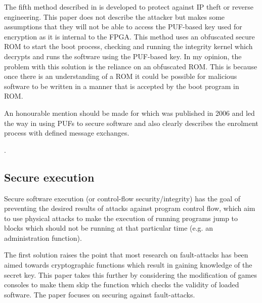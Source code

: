 The fifth method described in \cite{Gora2010} is developed to protect against IP theft or reverse engineering. This paper does not describe the attacker but makes some assumptions that they will not be able to access the PUF-based key used for encryption as it is internal to the FPGA. This method uses an obfuscated secure ROM to start the boot process, checking and running the integrity kernel which decrypts and runs the software using the PUF-based key. In my opinion, the problem with this solution is the reliance on an obfuscated ROM. This is because once there is an understanding of a ROM it could be possible for malicious software to be written in a manner that is accepted by the boot program in ROM.

\ifnotesincluded
{}
\fi

An honourable mention should be made for \cite{Simpson2006} which was published in 2006 and led the way in using PUFs to secure software and also clearly describes the enrolment process with defined message exchanges.

\ifnotesincluded
{}.
\fi


\subsection{Secure execution}\label{secureExecutionSolutions}

Secure software execution (or control-flow security/integrity) has the goal of preventing the desired results of attacks against program control flow, which aim to use physical attacks to make the execution of running programs jump to blocks which should not be running at that particular time (e.g. an administration function).

The first solution \cite{Werner2016} raises the point that most research on fault-attacks has been aimed towards cryptographic functions which result in gaining knowledge of the secret key. This paper takes this further by considering the modification of games consoles to make them skip the function which checks the validity of loaded software. The paper focuses on securing against fault-attacks.

